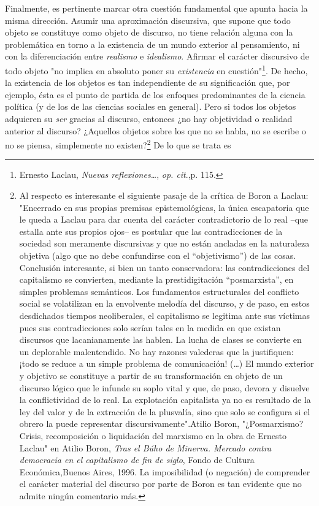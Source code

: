 \documentclass{book}
\begin{document}
Finalmente, es pertinente marcar otra cuestión fundamental que apunta
hacia la misma dirección. Asumir una aproximación discursiva, que supone
que todo objeto se constituye como objeto de discurso, no tiene relación
alguna con la problemática en torno a la existencia de un mundo exterior
al pensamiento, ni con la diferenciación entre \emph{realismo} e
\emph{idealismo}. Afirmar el carácter discursivo de todo objeto "no
implica en absoluto poner su \emph{existencia} en cuestión"\footnote{Ernesto
  Laclau, \emph{Nuevas reflexiones\ldots{}}, \emph{op. cit}.,p. 115.}.
De hecho, la existencia de los objetos es tan independiente de su
significación que, por ejemplo, ésta es el punto de partida de los
enfoques predominantes de la ciencia política (y de los de las ciencias
sociales en general). Pero si todos los objetos adquieren su \emph{ser}
gracias al discurso, entonces ¿no hay objetividad o realidad anterior al
discurso? ¿Aquellos objetos sobre los que no se habla, no se escribe o
no se piensa, simplemente no existen?\footnote{Al respecto es
  interesante el siguiente pasaje de la crítica de Boron a Laclau:
  "Encerrado en sus propias premisas epistemológicas, la única
  escapatoria que le queda a Laclau para dar cuenta del carácter
  contradictorio de lo real --que estalla ante sus propios ojos-- es
  postular que las contradicciones de la sociedad son meramente
  discursivas y que no están ancladas en la naturaleza objetiva (algo
  que no debe confundirse con el ``objetivismo'') de las cosas.
  Conclusión interesante, si bien un tanto conservadora: las
  contradicciones del capitalismo se convierten, mediante la
  prestidigitación ``posmarxista'', en simples problemas semánticos. Los
  fundamentos estructurales del conflicto social se volatilizan en la
  envolvente melodía del discurso, y de paso, en estos desdichados
  tiempos neoliberales, el capitalismo se legitima ante sus víctimas
  pues sus contradicciones solo serían tales en la medida en que existan
  discursos que lacanianamente las hablen. La lucha de clases se
  convierte en un deplorable malentendido. No hay razones valederas que
  la justifiquen: ¡todo se reduce a un simple problema de comunicación!
  (\dots) El mundo exterior y objetivo se constituye a partir de su
  transformación en objeto de un discurso lógico que le infunde su soplo
  vital y que, de paso, devora y disuelve la conflictividad de lo real.
  La explotación capitalista ya no es resultado de la ley del valor y de
  la extracción de la plusvalía, sino que solo se configura si el obrero
  la puede representar discursivamente".Atilio Boron, "¿Posmarxismo?
  Crisis, recomposición o liquidación del marxismo en la obra de Ernesto
  Laclau" en Atilio Boron, \emph{Tras el Búho de Minerva. Mercado contra
  democracia en el capitalismo de fin de siglo}, Fondo de Cultura
  Económica,Buenos Aires, 1996. La imposibilidad (o negación) de
  comprender el carácter material del discurso por parte de Boron es tan
  evidente que no admite ningún comentario más.} De lo que se trata es
\end{document}
